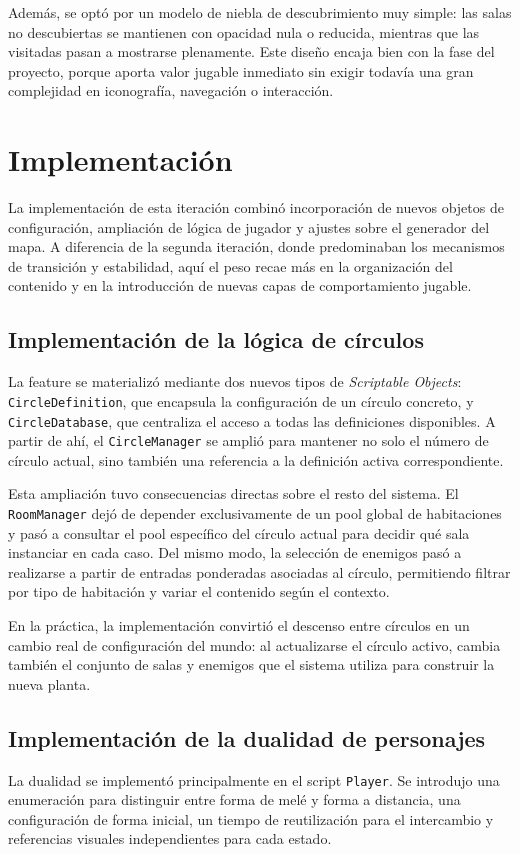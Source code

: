 Además, se optó por un modelo de niebla de descubrimiento muy simple: las salas no
descubiertas se mantienen con opacidad nula o reducida, mientras que las visitadas pasan a
mostrarse plenamente. Este diseño encaja bien con la fase del proyecto, porque aporta valor
jugable inmediato sin exigir todavía una gran complejidad en iconografía, navegación o
interacción.

\section{Implementación}
La implementación de esta iteración combinó incorporación de nuevos objetos de
configuración, ampliación de lógica de jugador y ajustes sobre el generador del mapa. A
diferencia de la segunda iteración, donde predominaban los mecanismos de transición y
estabilidad, aquí el peso recae más en la organización del contenido y en la introducción
de nuevas capas de comportamiento jugable.

\subsection{Implementación de la lógica de círculos}
La feature se materializó mediante dos nuevos tipos de \textit{Scriptable Objects}:
\texttt{CircleDefinition}, que encapsula la configuración de un círculo concreto, y
\texttt{CircleDatabase}, que centraliza el acceso a todas las definiciones disponibles. A
partir de ahí, el \texttt{CircleManager} se amplió para mantener no solo el número de
círculo actual, sino también una referencia a la definición activa correspondiente.

Esta ampliación tuvo consecuencias directas sobre el resto del sistema. El
\texttt{RoomManager} dejó de depender exclusivamente de un pool global de habitaciones y
pasó a consultar el pool específico del círculo actual para decidir qué sala instanciar en
cada caso. Del mismo modo, la selección de enemigos pasó a realizarse a partir de entradas
ponderadas asociadas al círculo, permitiendo filtrar por tipo de habitación y variar el
contenido según el contexto.

En la práctica, la implementación convirtió el descenso entre círculos en un cambio real de
configuración del mundo: al actualizarse el círculo activo, cambia también el conjunto de
salas y enemigos que el sistema utiliza para construir la nueva planta.

\subsection{Implementación de la dualidad de personajes}
La dualidad se implementó principalmente en el script \texttt{Player}. Se introdujo una
enumeración para distinguir entre forma de melé y forma a distancia, una configuración de
forma inicial, un tiempo de reutilización para el intercambio y referencias visuales
independientes para cada estado.

